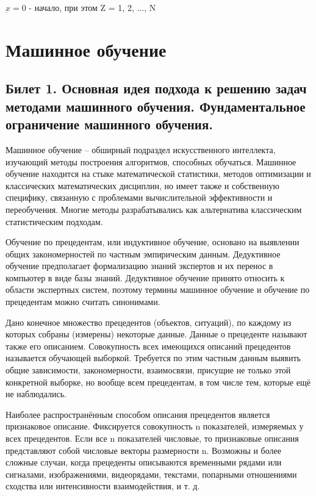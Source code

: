 \documentclass[a4paper, 12pt]{article}
\begin{document}
	$\underbar{x} = 0$ - начало, при этом Z = {1, 2, ..., N}
	\section*{Машинное обучение}
	\subsection*{Билет 1. Основная идея подхода к решению задач методами машинного обучения. Фундаментальное ограничение машинного обучения.}
	Машинное обучение -- обширный подраздел искусственного интеллекта, изучающий методы построения алгоритмов, способных обучаться. Машинное обучение находится на стыке математической статистики, методов оптимизации и классических математических дисциплин, но имеет также и собственную специфику, связанную с проблемами вычислительной эффективности и переобучения. Многие методы разрабатывались как альтернатива классическим статистическим подходам. 
	
	Обучение по прецедентам, или индуктивное обучение, основано на выявлении общих закономерностей по частным эмпирическим данным. Дедуктивное обучение предполагает формализацию знаний экспертов и их перенос в компьютер в виде базы знаний. Дедуктивное обучение принято относить к области экспертных систем, поэтому термины машинное обучение и обучение по прецедентам можно считать синонимами.
	
	Дано конечное множество прецедентов (объектов, ситуаций), по каждому из которых собраны (измерены) некоторые данные. Данные о прецеденте называют также его описанием. Совокупность всех имеющихся описаний прецедентов называется обучающей выборкой. Требуется по этим частным данным выявить общие зависимости, закономерности, взаимосвязи, присущие не только этой конкретной выборке, но вообще всем прецедентам, в том числе тем, которые ещё не наблюдались.
	
	Наиболее распространённым способом описания прецедентов является признаковое описание. Фиксируется совокупность n показателей, измеряемых у всех прецедентов. Если все n показателей числовые, то признаковые описания представляют собой числовые векторы размерности n. Возможны и более сложные случаи, когда прецеденты описываются временными рядами или сигналами, изображениями, видеорядами, текстами, попарными отношениями сходства или интенсивности взаимодействия, и т. д.
	
\end{document}
